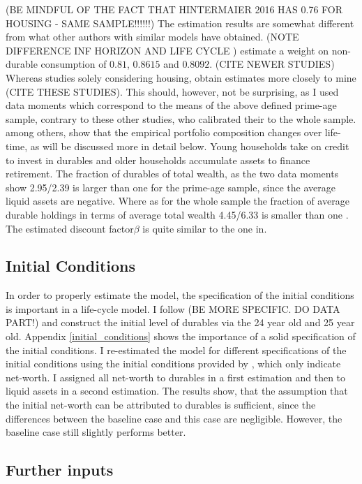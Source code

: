 \documentclass[a4paper,12pt,legno]{article}
\begin{document}
(BE MINDFUL OF THE FACT THAT HINTERMAIER 2016 HAS 0.76 FOR HOUSING - SAME SAMPLE!!!!!!) 
The estimation results are somewhat different from what other authors with similar models have obtained. (NOTE DIFFERENCE INF HORIZON AND LIFE CYCLE ) \cite{FV&K2011} estimate a weight on non-durable consumption of $0.81$, \cite{yang2009} $0.8615$ and \cite{hintermaier2010} $0.8092$. (CITE NEWER STUDIES) Whereas studies solely considering housing, obtain estimates more closely to mine (CITE THESE STUDIES). This should, however, not be surprising, as I used data moments which correspond to the means of the above defined prime-age sample, contrary to these other studies, who calibrated their to the whole sample. \cite{diaz2010} among others, show that the empirical portfolio composition changes over life-time, as will be discussed more in detail below. Young households take on credit to invest in durables and older households accumulate assets to finance retirement. The fraction of durables of total wealth, as the two data moments show 2.95/2.39 is larger than one for the prime-age sample, since the average liquid assets are negative. Where as for the whole sample the fraction of average durable holdings in terms of average total wealth 4.45/6.33 is smaller than one \citep{hintermaier2010}. The estimated  discount factor$\beta$ is quite similar to the one in\cite{hintermaier2011}. 

\subsection{Initial Conditions}
In order to properly estimate the model, the specification of the initial conditions is important in a life-cycle model. I follow \cite{hintermaier2011} (BE MORE SPECIFIC. DO DATA PART!) and construct the initial level of durables via the 24 year old and 25 year old. Appendix \ref{initial_conditions} shows the importance of a solid specification of the initial conditions. I re-estimated the model for different specifications of the initial conditions using the initial conditions provided by \cite{hintermaier2011}, which only indicate net-worth. I assigned all net-worth to durables in a first estimation and then to liquid assets in a second estimation. The results show, that the assumption that the initial net-worth can be attributed to durables is sufficient, since the differences between the baseline case and this case are negligible. However, the baseline case still slightly performs better. 

\subsection{Further inputs}
\end{document}
